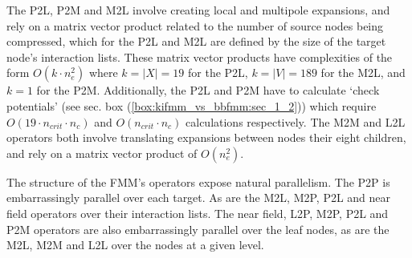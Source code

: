 The P2L, P2M and M2L involve creating local and multipole expansions, and rely on a matrix vector product related to the number of source nodes being compressed, which for the P2L and M2L are defined by the size of the target node's interaction lists. These matrix vector products have complexities of the form $O(k \cdot n_e^2)$ where $k = |X| = 19$ for the P2L, $k = |V| = 189$ for the M2L, and $k = 1$ for the P2M. Additionally, the P2L and P2M have to calculate `check potentials' (see sec. box (\ref{box:kifmm_vs_bbfmm:sec_1_2})) which require $O(19 \cdot n_{crit} \cdot n_c)$ and $O(n_{crit} \cdot n_c)$ calculations respectively. The M2M and L2L operators both involve translating expansions between nodes their eight children, and rely on a matrix vector product of $O(n_e^2)$.

The structure of the FMM's operators expose natural parallelism. The P2P is embarrassingly parallel over each target. As are the M2L, M2P, P2L and near field operators over their interaction lists. The near field, L2P, M2P, P2L and P2M operators are also embarrassingly parallel over the leaf nodes, as are the M2L, M2M and L2L over the nodes at a given level.


